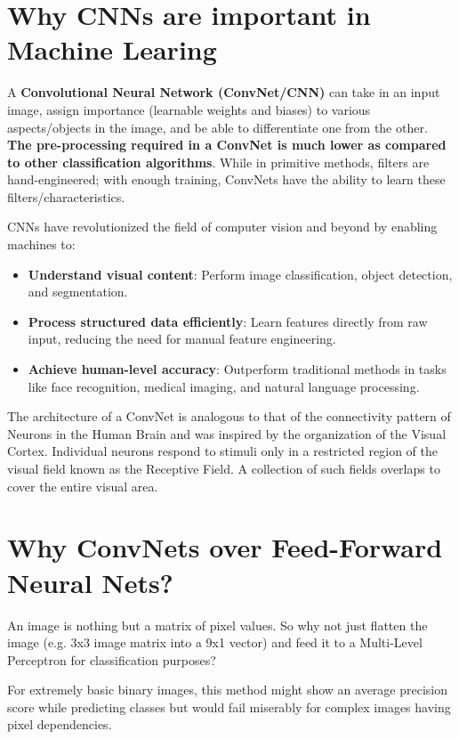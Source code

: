 \section{Why CNNs are important in Machine Learing}
A \textbf{Convolutional Neural Network (ConvNet/CNN)} can take in an input image, assign importance (learnable weights and biases) to various aspects/objects in the image, and be able to differentiate one from the other. \textbf{The pre-processing required in a ConvNet is much lower as compared to other classification algorithms}. While in primitive methods, filters are hand-engineered; with enough training, ConvNets have the ability to learn these filters/characteristics.

\setlength{\parindent}{0pt}CNNs have revolutionized the field of computer vision and beyond by enabling machines to:
\begin{itemize}
    \item \textbf{Understand visual content}: Perform image classification, object detection, and segmentation.
    \item \textbf{Process structured data efficiently}: Learn features directly from raw input, reducing the need for manual feature engineering.
    \item \textbf{Achieve human-level accuracy}: Outperform traditional methods in tasks like face recognition, medical imaging, and natural language processing.
\end{itemize}

The architecture of a ConvNet is analogous to that of the connectivity pattern of Neurons in the Human Brain and was inspired by the organization of the Visual Cortex. Individual neurons respond to stimuli only in a restricted region of the visual field known as the Receptive Field. A collection of such fields overlaps to cover the entire visual area.

\section{Why ConvNets over Feed-Forward Neural Nets?}

An image is nothing but a matrix of pixel values. So why not just flatten the image (e.g. 3x3 image matrix into a 9x1 vector) and feed it to a Multi-Level Perceptron for classification purposes?

For extremely basic binary images, this method might show an average precision score while predicting classes but would fail miserably for complex images having pixel dependencies.

